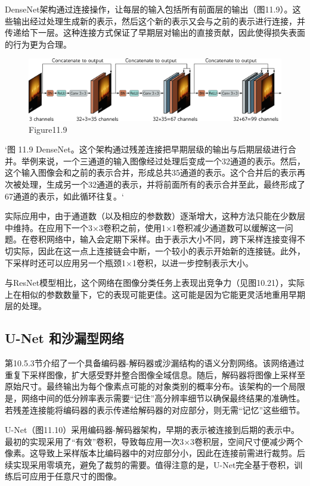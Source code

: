 DenseNet架构通过连接操作，让每层的输入包括所有前面层的输出（图11.9）。这些输出经过处理生成新的表示，然后这个新的表示又会与之前的表示进行连接，并传递给下一层。这种连接方式保证了早期层对输出的直接贡献，因此使得损失表面的行为更为合理。

\begin{figure}[h!]
\centering
\includegraphics[width=0.7\linewidth]{png/chapter11/ResidualDensenet.png}
\caption{Figure11.9}
\end{figure}

`图 11.9 DenseNet。这个架构通过残差连接把早期层级的输出与后期层级进行合并。举例来说，一个三通道的输入图像经过处理后变成一个32通道的表示。然后，这个输入图像会和之前的表示合并，形成总共35通道的表示。这个合并后的表示再次被处理，生成另一个32通道的表示，并将前面所有的表示合并至此，最终形成了67通道的表示，如此循环往复。`

实际应用中，由于通道数（以及相应的参数数）逐渐增大，这种方法只能在少数层中维持。在应用下一个3×3卷积之前，使用1×1卷积减少通道数可以缓解这一问题。在卷积网络中，输入会定期下采样。由于表示大小不同，跨下采样连接变得不切实际，因此在这一点上连接链会中断，一个较小的表示开始新的连接链。此外，下采样时还可以应用另一个瓶颈1×1卷积，以进一步控制表示大小。

与ResNet模型相比，这个网络在图像分类任务上表现出竞争力（见图10.21），实际上在相似的参数数量下，它的表现可能更佳。这可能是因为它能更灵活地重用早期层的处理。

\subsection{U-Net 和沙漏型网络}
第10.5.3节介绍了一个具备编码器-解码器或沙漏结构的语义分割网络。该网络通过重复下采样图像，扩大感受野并整合图像全域信息。随后，解码器将图像上采样至原始尺寸。最终输出为每个像素点可能的对象类别的概率分布。该架构的一个局限是，网络中间的低分辨率表示需要“记住”高分辨率细节以确保最终结果的准确性。若残差连接能将编码器的表示传递给解码器的对应部分，则无需“记忆”这些细节。

U-Net（图11.10）采用编码器-解码器架构，早期的表示被连接到后期的表示中。最初的实现采用了“有效”卷积，导致每应用一次3×3卷积层，空间尺寸便减少两个像素。这导致上采样版本比编码器中的对应部分小，因此在连接前需进行裁剪。后续实现采用零填充，避免了裁剪的需要。值得注意的是，U-Net完全基于卷积，训练后可应用于任意尺寸的图像。

